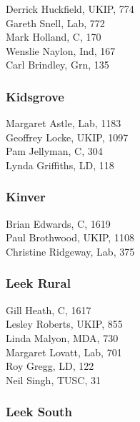 \documentclass[a4paper,openany,10pt]{book}
\begin{document}
Derrick Huckfield, UKIP, 774\\
Gareth Snell, Lab, 772\\
Mark Holland, C, 170\\
Wenslie Naylon, Ind, 167\\
Carl Brindley, Grn, 135\\


\subsubsection*{Kidsgrove}



Margaret Astle, Lab, 1183\\
Geoffrey Locke, UKIP, 1097\\
Pam Jellyman, C, 304\\
Lynda Griffiths, LD, 118\\


\subsubsection*{Kinver}



Brian Edwards, C, 1619\\
Paul Brothwood, UKIP, 1108\\
Christine Ridgeway, Lab, 375\\


\subsubsection*{Leek Rural}



Gill Heath, C, 1617\\
Lesley Roberts, UKIP, 855\\
Linda Malyon, MDA, 730\\
Margaret Lovatt, Lab, 701\\
Roy Gregg, LD, 122\\
Neil Singh, TUSC, 31\\


\subsubsection*{Leek South}

\end{document}
